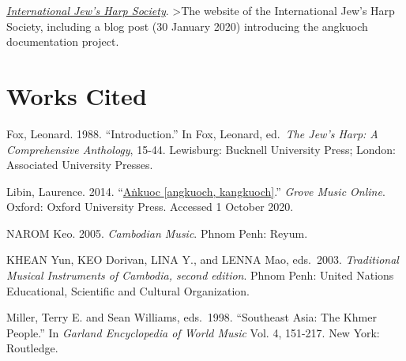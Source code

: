 \documentclass[twoside]{article}
\begin{document}
\href{https://jewsharpsociety.org/}{\emph{International Jew's
Harp Society}}. \textgreater The website of the International Jew's Harp
Society, including a blog post (30 January 2020) introducing the
angkuoch documentation project.

\hypertarget{works-cited}{%
\section*{Works Cited}\label{works-cited}}

\begin{hangparas}{15pt}{1}

Fox, Leonard. 1988. ``Introduction.'' In Fox, Leonard,
ed.~\emph{The Jew's Harp: A Comprehensive Anthology}, 15-44. Lewisburg:
Bucknell University Press; London: Associated University Presses.

Libin, Laurence. 2014.
``\href{https://www.oxfordmusiconline.com/grovemusic/view/10.1093/gmo/9781561592630.001.0001/omo-9781561592630-e-4002267773}{Aṅkuoc
{[}angkuoch, kangkuoch{]}}.'' \emph{Grove Music Online}. Oxford: Oxford
University Press. Accessed 1 October 2020.

NAROM Keo. 2005. \emph{Cambodian Music}. Phnom Penh: Reyum.

KHEAN Yun, KEO Dorivan, LINA Y., and LENNA Mao, eds.~2003.
\emph{Traditional Musical Instruments of Cambodia, second edition}.
Phnom Penh: United Nations Educational, Scientific and Cultural
Organization.

Miller, Terry E. and Sean Williams, eds.~1998. ``Southeast
Asia: The Khmer People.'' In \emph{Garland Encyclopedia of World Music}
Vol. 4, 151-217. New York: Routledge.

\end{hangparas}
\end{document}
